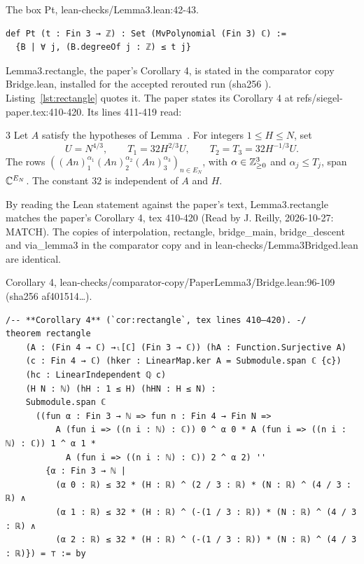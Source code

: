 \begin{listing}[tbp]
\caption{The box Pt, lean-checks/Lemma3.lean:42-43.}\label{lst:pt}
\begin{Verbatim}
def Pt (t : Fin 3 → ℤ) : Set (MvPolynomial (Fin 3) ℂ) :=
  {B | ∀ j, (B.degreeOf j : ℤ) ≤ t j}
\end{Verbatim}
\end{listing}

Lemma3.rectangle, the paper's Corollary 4, is stated in the comparator copy Bridge.lean, installed for the accepted rerouted run (sha256 ).
Listing~\ref{lst:rectangle} quotes it.
The paper states its Corollary 4 at refs/siegel-paper.tex:410-420.
Its lines 411-419 read:
\begin{paperquote}{}
\expandafter\def\csname paperref@lem:interpolation\endcsname{3}\renewcommand{\ref}[1]{\csname paperref@#1\endcsname}
Let $A$ satisfy the hypotheses of Lemma~\ref{lem:interpolation}.
For integers $1\le H\le N$, set
\[
 U=N^{4/3},\qquad T_1=32H^{2/3}U,
 \qquad T_2=T_3=32H^{-1/3}U.
\]
The rows $((An)_1^{\alpha_1}(An)_2^{\alpha_2}(An)_3^{\alpha_3})_{n\in E_N}$,
with $\alpha\in\mathbb Z_{\ge0}^3$ and $\alpha_j\le T_j$, span $\mathbb C^{E_N}$.
The constant $32$ is independent of $A$ and $H$.
\end{paperquote}
By reading the Lean statement against the paper's text, Lemma3.rectangle matches the paper's Corollary 4, tex 410-420 (Read by J. Reilly, 2026-10-27: MATCH).
The copies of interpolation, rectangle, bridge\_main, bridge\_descent and via\_lemma3 in the comparator copy and in lean-checks/Lemma3Bridged.lean are identical.

\begin{listing}[tbp]
\caption{Corollary 4, lean-checks/\allowbreak comparator-copy/\allowbreak PaperLemma3/\allowbreak Bridge.lean:96-109 (sha256 af401514\ldots).}\label{lst:rectangle}
\begin{Verbatim}
/-- **Corollary 4** (`cor:rectangle`, tex lines 410–420). -/
theorem rectangle
    (A : (Fin 4 → ℂ) →ₗ[ℂ] (Fin 3 → ℂ)) (hA : Function.Surjective A)
    (c : Fin 4 → ℂ) (hker : LinearMap.ker A = Submodule.span ℂ {c})
    (hc : LinearIndependent ℚ c)
    (H N : ℕ) (hH : 1 ≤ H) (hHN : H ≤ N) :
    Submodule.span ℂ
      ((fun α : Fin 3 → ℕ => fun n : Fin 4 → Fin N =>
          A (fun i => ((n i : ℕ) : ℂ)) 0 ^ α 0 * A (fun i => ((n i : ℕ) : ℂ)) 1 ^ α 1 *
            A (fun i => ((n i : ℕ) : ℂ)) 2 ^ α 2) ''
        {α : Fin 3 → ℕ |
          (α 0 : ℝ) ≤ 32 * (H : ℝ) ^ (2 / 3 : ℝ) * (N : ℝ) ^ (4 / 3 : ℝ) ∧
          (α 1 : ℝ) ≤ 32 * (H : ℝ) ^ (-(1 / 3 : ℝ)) * (N : ℝ) ^ (4 / 3 : ℝ) ∧
          (α 2 : ℝ) ≤ 32 * (H : ℝ) ^ (-(1 / 3 : ℝ)) * (N : ℝ) ^ (4 / 3 : ℝ)}) = ⊤ := by
\end{Verbatim}
\end{listing}

